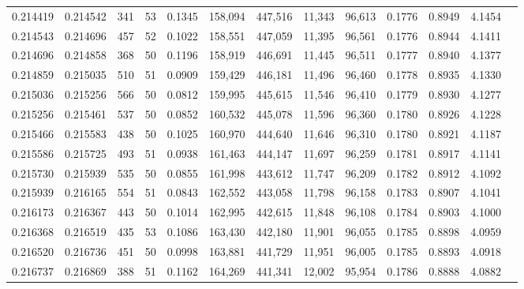 \begin{tabular}{rrrrrrrrrrrrr}
0.214419 & 0.214542 &   341 &  53 &                                     0.1345 & 158,094 & 447,516 &  11,343 &  96,613 & 0.1776 & 0.8949 & 4.1454 \\
0.214543 & 0.214696 &   457 &  52 &                                     0.1022 & 158,551 & 447,059 &  11,395 &  96,561 & 0.1776 & 0.8944 & 4.1411 \\
0.214696 & 0.214858 &   368 &  50 &                                     0.1196 & 158,919 & 446,691 &  11,445 &  96,511 & 0.1777 & 0.8940 & 4.1377 \\
0.214859 & 0.215035 &   510 &  51 &                                     0.0909 & 159,429 & 446,181 &  11,496 &  96,460 & 0.1778 & 0.8935 & 4.1330 \\
0.215036 & 0.215256 &   566 &  50 &                                     0.0812 & 159,995 & 445,615 &  11,546 &  96,410 & 0.1779 & 0.8930 & 4.1277 \\
0.215256 & 0.215461 &   537 &  50 &                                     0.0852 & 160,532 & 445,078 &  11,596 &  96,360 & 0.1780 & 0.8926 & 4.1228 \\
0.215466 & 0.215583 &   438 &  50 &                                     0.1025 & 160,970 & 444,640 &  11,646 &  96,310 & 0.1780 & 0.8921 & 4.1187 \\
0.215586 & 0.215725 &   493 &  51 &                                     0.0938 & 161,463 & 444,147 &  11,697 &  96,259 & 0.1781 & 0.8917 & 4.1141 \\
0.215730 & 0.215939 &   535 &  50 &                                     0.0855 & 161,998 & 443,612 &  11,747 &  96,209 & 0.1782 & 0.8912 & 4.1092 \\
0.215939 & 0.216165 &   554 &  51 &                                     0.0843 & 162,552 & 443,058 &  11,798 &  96,158 & 0.1783 & 0.8907 & 4.1041 \\
0.216173 & 0.216367 &   443 &  50 &                                     0.1014 & 162,995 & 442,615 &  11,848 &  96,108 & 0.1784 & 0.8903 & 4.1000 \\
0.216368 & 0.216519 &   435 &  53 &                                     0.1086 & 163,430 & 442,180 &  11,901 &  96,055 & 0.1785 & 0.8898 & 4.0959 \\
0.216520 & 0.216736 &   451 &  50 &                                     0.0998 & 163,881 & 441,729 &  11,951 &  96,005 & 0.1785 & 0.8893 & 4.0918 \\
0.216737 & 0.216869 &   388 &  51 &                                     0.1162 & 164,269 & 441,341 &  12,002 &  95,954 & 0.1786 & 0.8888 & 4.0882 \\

\end{tabular}
